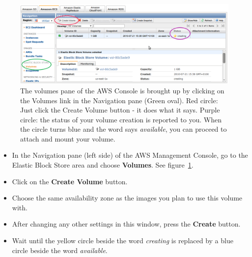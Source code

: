 \begin{figure}[!hd]
	\fbox
	{
		\begin{minipage}{13cm}
\includegraphics[width=\maxwidth]{"images/createVolume-1"}
\caption[Create volume in console]{\label{fig:createvolume}The volumes pane of the AWS Console is brought up by clicking on the Volumes link in the Navigation pane (Green oval).  Red circle: Just click the Create Volume button - it does what it says. Purple circle: the status of your volume creation is reported to you. When the circle turns blue and the word says \emph{available}, you can proceed to attach and mount your volume.}
		\end{minipage}
	}
\end{figure}

\begin{itemize}
\item In the Navigation pane (left side) of the AWS Management Console, go to the Elastic Block Store area and choose \textbf{Volumes}. See figure~\ref{fig:createvolume}.
\item Click on the \textbf{Create Volume} button.
\item Choose the same availability zone as the images you plan to use this volume with.
\item After changing any other settings in this window, press the \textbf{Create} button.
\item Wait until the yellow circle beside the word \emph{creating} is replaced by a blue circle beside the word \emph{available}.
\end{itemize}

